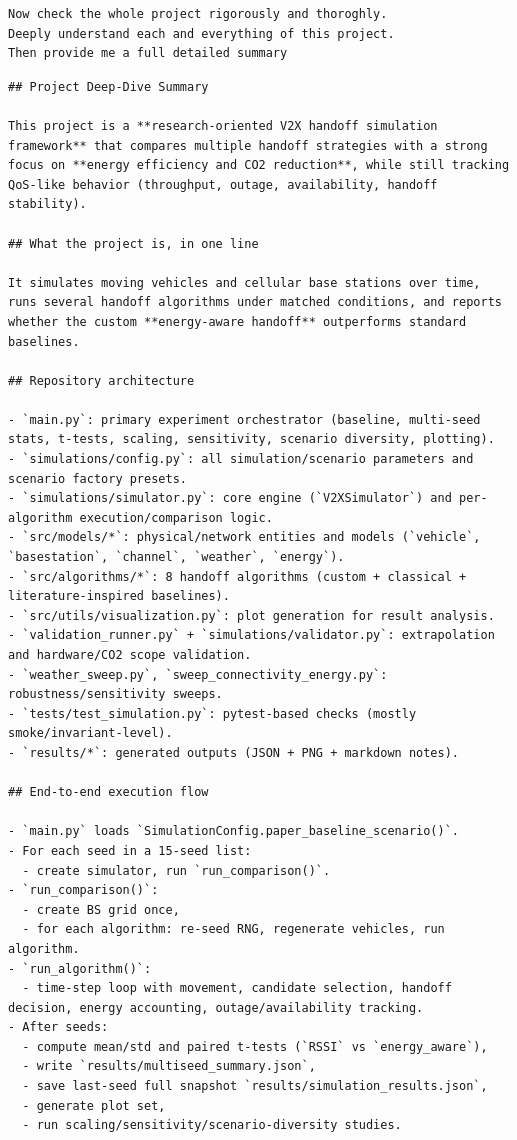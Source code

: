 \documentclass[11pt,a4paper]{article}
\newenvironment{userbox}
  {\begin{tcolorbox}[
    breakable,
    colback=UserBG,
    colframe=UserBorder,
    title=Source Request Extract,
    fonttitle=\bfseries\small\color{white},
    coltitle=white,
    colbacktitle=UserBorder,
    boxrule=0.5pt,
    arc=1.2mm,
    left=1.4mm,right=1.4mm,top=0.8mm,bottom=0.8mm,
    boxsep=0.6mm,
    before skip=0pt,
    after skip=0pt
  ]}
  {\end{tcolorbox}}
\newenvironment{assistantbox}
  {\begin{tcolorbox}[
    breakable,
    colback=AsstBG,
    colframe=AsstBorder,
    title=Project Overview Extract,
    fonttitle=\bfseries\small\color{white},
    coltitle=white,
    colbacktitle=AsstBorder,
    boxrule=0.5pt,
    arc=1.2mm,
    left=1.4mm,right=1.4mm,top=0.8mm,bottom=0.8mm,
    boxsep=0.6mm,
    before skip=0pt,
    after skip=0pt
  ]}
  {\end{tcolorbox}}
\begin{document}
\begin{userbox}
\begin{Verbatim}[breaklines=true,breakanywhere=true]
Now check the whole project rigorously and thoroghly.
Deeply understand each and everything of this project.
Then provide me a full detailed summary 
\end{Verbatim}
\end{userbox}

\begin{assistantbox}
\begin{Verbatim}[breaklines=true,breakanywhere=true]
## Project Deep-Dive Summary

This project is a **research-oriented V2X handoff simulation framework** that compares multiple handoff strategies with a strong focus on **energy efficiency and CO2 reduction**, while still tracking QoS-like behavior (throughput, outage, availability, handoff stability).

## What the project is, in one line

It simulates moving vehicles and cellular base stations over time, runs several handoff algorithms under matched conditions, and reports whether the custom **energy-aware handoff** outperforms standard baselines.

## Repository architecture

- `main.py`: primary experiment orchestrator (baseline, multi-seed stats, t-tests, scaling, sensitivity, scenario diversity, plotting).
- `simulations/config.py`: all simulation/scenario parameters and scenario factory presets.
- `simulations/simulator.py`: core engine (`V2XSimulator`) and per-algorithm execution/comparison logic.
- `src/models/*`: physical/network entities and models (`vehicle`, `basestation`, `channel`, `weather`, `energy`).
- `src/algorithms/*`: 8 handoff algorithms (custom + classical + literature-inspired baselines).
- `src/utils/visualization.py`: plot generation for result analysis.
- `validation_runner.py` + `simulations/validator.py`: extrapolation and hardware/CO2 scope validation.
- `weather_sweep.py`, `sweep_connectivity_energy.py`: robustness/sensitivity sweeps.
- `tests/test_simulation.py`: pytest-based checks (mostly smoke/invariant-level).
- `results/*`: generated outputs (JSON + PNG + markdown notes).

## End-to-end execution flow

- `main.py` loads `SimulationConfig.paper_baseline_scenario()`.
- For each seed in a 15-seed list:
  - create simulator, run `run_comparison()`.
- `run_comparison()`:
  - create BS grid once,
  - for each algorithm: re-seed RNG, regenerate vehicles, run algorithm.
- `run_algorithm()`:
  - time-step loop with movement, candidate selection, handoff decision, energy accounting, outage/availability tracking.
- After seeds:
  - compute mean/std and paired t-tests (`RSSI` vs `energy_aware`),
  - write `results/multiseed_summary.json`,
  - save last-seed full snapshot `results/simulation_results.json`,
  - generate plot set,
  - run scaling/sensitivity/scenario-diversity studies.


\end{Verbatim}
\end{assistantbox}
\end{document}
